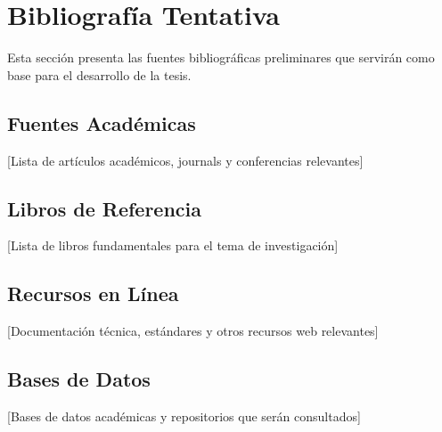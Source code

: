 \section{Bibliografía Tentativa}

Esta sección presenta las fuentes bibliográficas preliminares que servirán como base para el desarrollo de la tesis.

\subsection{Fuentes Académicas}
[Lista de artículos académicos, journals y conferencias relevantes]

\subsection{Libros de Referencia}
[Lista de libros fundamentales para el tema de investigación]

\subsection{Recursos en Línea}
[Documentación técnica, estándares y otros recursos web relevantes]

\subsection{Bases de Datos}
[Bases de datos académicas y repositorios que serán consultados]